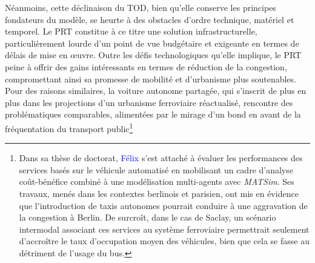 \begin{refsegment}
Néanmoins, cette déclinaison du \acrshort{TOD}, bien qu’elle conserve les principes fondateurs du modèle, se heurte à des obstacles d’ordre technique, matériel et temporel. Le \acrshort{PRT} constitue à ce titre une solution infrastructurelle, particulièrement lourde d’un point de vue budgétaire et exigeante en termes de délais de mise en œuvre. Outre les défis technologiques qu’elle implique, le \acrshort{PRT} peine à offrir des gains intéressants en termes de réduction de la congestion, compromettant ainsi sa promesse de mobilité et d’urbanisme plus soutenables. Pour des raisons similaires, la voiture autonome partagée, qui s’inscrit de plus en plus dans les projections d’un urbanisme ferroviaire réactualisé, rencontre des problématiques comparables, alimentées par le mirage d'un bond en avant de la fréquentation du transport public\footnote{
    Dans sa thèse de doctorat, \textcolor{blue}{Félix} \textcolor{blue}{\textcite[333]{carreyre_are_2023}} s’est attaché à évaluer les performances des services basés sur le véhicule automatisé en mobilisant un cadre d’analyse coût-bénéfice combiné à une modélisation multi-agents avec \textsl{MATSim}. Ses travaux, menés dans les contextes berlinois et parisien, ont mis en évidence que l’introduction de taxis autonomes pourrait conduire à une aggravation de la congestion à Berlin. De surcroît, dans le cas de Saclay, un scénario intermodal associant ces services au système ferroviaire permettrait seulement d’accroître le taux d’occupation moyen des véhicules, bien que cela se fasse au détriment de l’usage du bus.
}
\end{refsegment}
